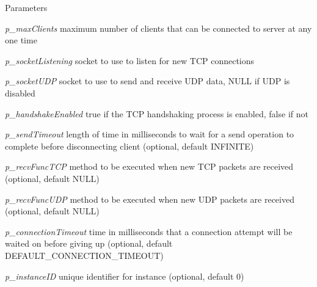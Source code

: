 \begin{DoxyParams}{Parameters}
\item[{\em p\_\-maxClients}]maximum number of clients that can be connected to server at any one time \item[{\em p\_\-socketListening}]socket to use to listen for new TCP connections \item[{\em p\_\-socketUDP}]socket to use to send and receive UDP data, NULL if UDP is disabled \item[{\em p\_\-handshakeEnabled}]true if the TCP handshaking process is enabled, false if not \item[{\em p\_\-sendTimeout}]length of time in milliseconds to wait for a send operation to complete before disconnecting client (optional, default INFINITE) \item[{\em p\_\-recvFuncTCP}]method to be executed when new TCP packets are received (optional, default NULL) \item[{\em p\_\-recvFuncUDP}]method to be executed when new UDP packets are received (optional, default NULL) \item[{\em p\_\-connectionTimeout}]time in milliseconds that a connection attempt will be waited on before giving up (optional, default DEFAULT\_\-CONNECTION\_\-TIMEOUT) \item[{\em p\_\-instanceID}]unique identifier for instance (optional, default 0) \end{DoxyParams}

